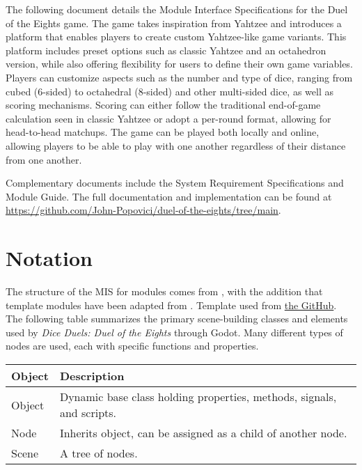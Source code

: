 \documentclass[12pt, titlepage]{article}
\begin{document}
The following document details the Module Interface Specifications for the Duel of the Eights game. The game takes inspiration from Yahtzee and introduces a platform that enables players to create custom Yahtzee-like game variants. This platform includes preset options such as classic Yahtzee and an octahedron version, while also offering flexibility for users to define their own game variables. Players can customize aspects such as the number and type of dice, ranging from cubed (6-sided) to octahedral (8-sided) and other multi-sided dice, as well as scoring mechanisms. Scoring can either follow the traditional end-of-game calculation seen in classic Yahtzee or adopt a per-round format, allowing for head-to-head matchups. The game can be played both locally and online, allowing players to be able to play with one another regardless of their distance from one another.

Complementary documents include the System Requirement Specifications
and Module Guide.  The full documentation and implementation can be
found at \url{https://github.com/John-Popovici/duel-of-the-eights/tree/main}.  

\newpage
\section{Notation}


The structure of the MIS for modules comes from \citet{HoffmanAndStrooper1995},
with the addition that template modules have been adapted from
\cite{GhezziEtAl2003}. Template used from \href{https://github.com/smiths/capTemplate}{the \progname GitHub}.\\

The following table summarizes the primary scene-building classes and elements used by \textit{Dice Duels: Duel of the Eights} through Godot. Many different types of nodes are used, each with specific functions and properties.

\begin{center}
\renewcommand{\arraystretch}{1.2}
\noindent 
\begin{tabular}{l l} 
\toprule 
\textbf{Object} & \textbf{Description}\\ 
\midrule
Object & Dynamic base class holding properties, methods, signals, and scripts.\\
Node & Inherits object, can be assigned as a child of another node.\\
Scene & A tree of nodes.\\
\bottomrule
\end{tabular} 
\end{center}
\end{document}
